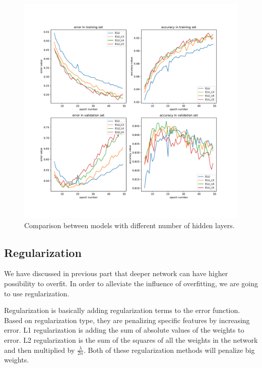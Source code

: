 \documentclass{article}
\begin{document}
\begin{figure}[tb]
\begin{center}
\centerline{\includegraphics[width=\columnwidth]{fig/num_layer.pdf}}
\caption{Comparison between models with different number of hidden layers. }
\label{fig:base_num_layer}
\end{center}
\end{figure} 










\subsection{Regularization}
We have discussed in previous part that deeper network can have higher possibility to overfit. In order to alleviate the influence of overfitting, we are going to use regularization. 


Regularization is basically adding regularization terms to the error function. Based on regularization type, they are penalizing specific features by increasing error. L1 regularization is adding the sum of absolute values of the weights to error. L2 regularization is the sum of the squares of all the weights in the network and then multiplied by $\frac{\lambda}{2n}$. Both of these regularization methods will penalize big weights. %
\end{document}
